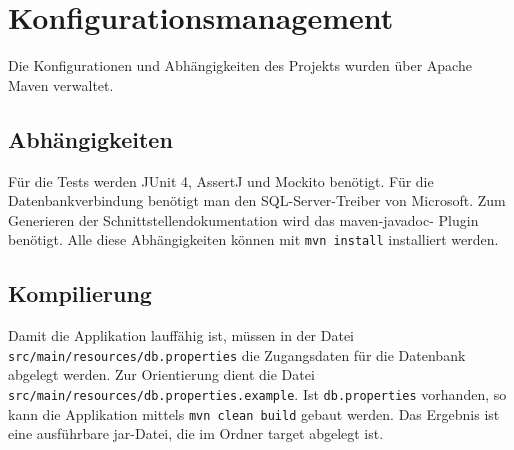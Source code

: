 \section{Konfigurationsmanagement}
Die Konfigurationen und Abhängigkeiten des Projekts wurden über Apache Maven verwaltet.

\subsection{Abhängigkeiten}
Für die Tests werden JUnit 4, AssertJ und Mockito benötigt. Für die Datenbankverbindung benötigt man den SQL-Server-Treiber von Microsoft. Zum Generieren der Schnittstellendokumentation wird das maven-javadoc- Plugin benötigt. Alle diese Abhängigkeiten können mit \texttt{mvn install} installiert werden.

\subsection{Kompilierung}
Damit die Applikation lauffähig ist, müssen in der Datei \texttt{src/main/resources/db.properties} die Zugangsdaten für die Datenbank abgelegt werden. Zur Orientierung dient die Datei \texttt{src/main/resources/db.properties.example}. Ist \texttt{db.properties} vorhanden, so kann die Applikation mittels \texttt{mvn clean build} gebaut werden. Das Ergebnis ist eine ausführbare jar-Datei, die im Ordner target abgelegt ist.
